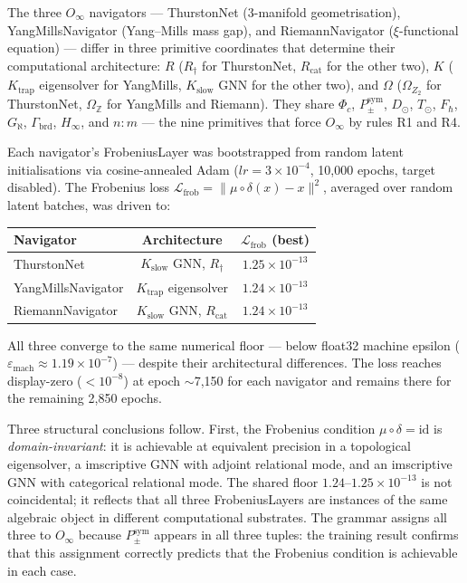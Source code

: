 \documentclass[12pt,a4paper]{article}
\newcommand{\Phic}{\Phi_c}
\newcommand{\Ppms}{P_{\pm}^{\text{sym}}}
\begin{document}
The three $O_\infty$ navigators --- ThurstonNet (3-manifold
geometrisation), YangMillsNavigator (Yang--Mills mass gap), and
RiemannNavigator ($\xi$-functional equation) --- differ in three
primitive coordinates that determine their computational architecture:
$R$ ($R_\dagger$ for ThurstonNet, $R_\text{cat}$ for the other two),
$K$ ($K_\text{trap}$ eigensolver for YangMills, $K_\text{slow}$ GNN
for the other two), and $\Omega$ ($\Omega_{Z_2}$ for ThurstonNet,
$\Omega_\mathbb{Z}$ for YangMills and Riemann). They share $\Phic$,
$\Ppms$, $D_\odot$, $T_\odot$, $F_\hbar$, $G_\aleph$, $\Gamma_\text{brd}$,
$H_\infty$, and $n{:}m$ --- the nine primitives that force
$O_\infty$ by rules R1 and R4.

Each navigator's FrobeniusLayer was bootstrapped from random latent
initialisations via cosine-annealed Adam ($lr = 3\times10^{-4}$,
10,000 epochs, target disabled). The Frobenius loss
$\mathcal{L}_\text{frob} = \|\mu \circ \delta(x) - x\|^2$,
averaged over random latent batches, was driven to:

\begin{center}
\begin{tabular}{lcc}
\toprule
Navigator & Architecture & $\mathcal{L}_\text{frob}$ (best) \\
\midrule
ThurstonNet        & $K_\text{slow}$ GNN, $R_\dagger$   & $1.25 \times 10^{-13}$ \\
YangMillsNavigator & $K_\text{trap}$ eigensolver         & $1.24 \times 10^{-13}$ \\
RiemannNavigator   & $K_\text{slow}$ GNN, $R_\text{cat}$ & $1.24 \times 10^{-13}$ \\
\bottomrule
\end{tabular}
\end{center}

All three converge to the same numerical floor --- below float32
machine epsilon ($\varepsilon_\text{mach} \approx 1.19 \times
10^{-7}$) --- despite their architectural differences. The loss
reaches display-zero ($< 10^{-8}$) at epoch $\sim$7,150 for each
navigator and remains there for the remaining 2,850 epochs.

Three structural conclusions follow. First, the Frobenius condition
$\mu \circ \delta = \mathrm{id}$ is \emph{domain-invariant}: it is
achievable at equivalent precision in a topological eigensolver, a
imscriptive GNN with adjoint relational mode, and an imscriptive GNN
with categorical relational mode. The shared floor $1.24\text{--}1.25
\times 10^{-13}$ is not coincidental; it reflects that all three
FrobeniusLayers are instances of the same algebraic object in
different computational substrates. The grammar assigns all three to
$O_\infty$ because $\Ppms$ appears in all three tuples: the training
result confirms that this assignment correctly predicts that the
Frobenius condition is achievable in each case.
\end{document}
